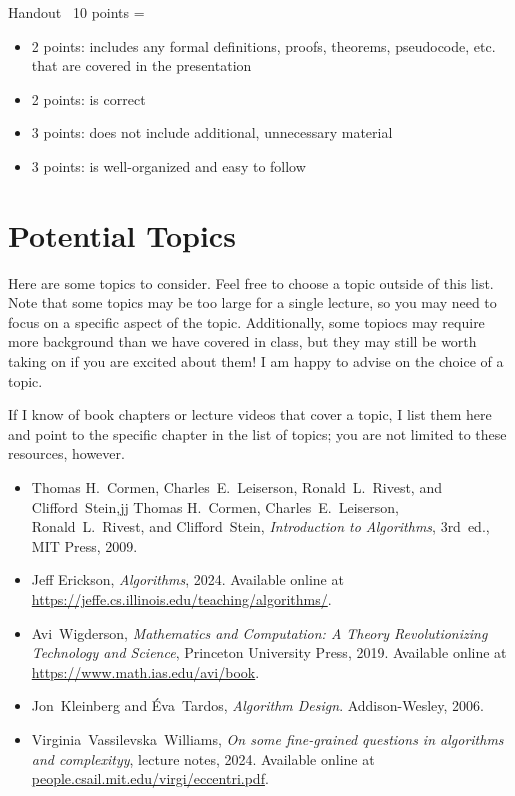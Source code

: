\documentclass[11pt]{article}
\begin{document}
\begin{Rubric}{Handout}~
    10 points = 
    \begin{itemize}
\item 2 points: includes any formal definitions, proofs, theorems, pseudocode, etc. that are covered in the presentation
\item 2 points: is correct
\item 3 points: does not include additional, unnecessary material
\item 3 points: is well-organized and easy to follow
    \end{itemize}
\end{Rubric}

\section{Potential Topics}

Here are some topics to consider. Feel free to choose a topic outside of this list. Note that some topics may
be too large for a single lecture, so you may need to focus on a specific aspect
of the topic. Additionally, some topiocs may require more background than we have covered in class,
but they may still be worth taking on if you are excited about them! I am happy to advise on
the choice of a topic.

If I know of book chapters or lecture videos that cover a topic, I list them here and point to the
specific chapter in the list of topics; you are not limited to these resources, however.

\begin{itemize}
    \item[\textbf{CLRS}] Thomas H.~Cormen, Charles~E.~Leiserson, Ronald~L.~Rivest, and Clifford~Stein,jj
Thomas H.~Cormen, Charles~E.~Leiserson, Ronald~L.~Rivest, and Clifford~Stein,
\textit{Introduction to Algorithms}, 3rd~ed., MIT Press, 2009.
    \item[\textbf{JeffE}] Jeff Erickson, \textit{Algorithms}, 2024. Available online at \url{https://jeffe.cs.illinois.edu/teaching/algorithms/}.
    \item[\textbf{Avi}] Avi~Wigderson,
\textit{Mathematics and Computation: A Theory Revolutionizing Technology and Science},
Princeton University Press, 2019. Available online at \url{https://www.math.ias.edu/avi/book}.
    \item[\textbf{KT}] Jon~Kleinberg and Éva~Tardos,
\textit{Algorithm Design}.
Addison-Wesley, 2006. 
    \item[\textbf{FGC}] Virginia~Vassilevska~Williams, \textit{On some fine-grained questions in algorithms and complexityy}, lecture notes, 2024. Available online at \url{people.csail.mit.edu/virgi/eccentri.pdf}.
\end{itemize}
\end{document}

